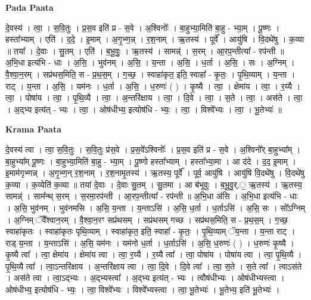 \documentclass[17pt]{extarticle}
\begin{document}
\textbf{Pada Paata} \newline

दे॒वस्य॑ । त्वा॒ । स॒वि॒तुः । प्र॒स॒व इति॑ प्र - स॒वे । अ॒श्विनोः᳚ । बा॒हुभ्या॒मिति॑ बा॒हु - भ्या॒म् । पू॒ष्णः । हस्ता᳚भ्याम् । एति॑ । द॒दे॒ । इ॒माम् । अ॒गृ॒भ्ण॒न्न् । र॒श॒नाम् । ऋ॒तस्य॑ । पूर्वे᳚ । आयु॑षि । वि॒दथे॑षु । क॒व्या ॥ तया᳚ । दे॒वाः । सु॒तम् । एति॑ । ब॒भू॒वुः॒ । ऋ॒तस्य॑ । सामन्न्॑ । स॒रम् । आ॒रप॒न्तीत्या᳚ - रप॑न्ती ॥ अ॒भि॒धा इत्य॑भि - धाः । अ॒सि॒ । भुव॑नम् । अ॒सि॒ । य॒न्ता । अ॒सि॒ । ध॒र्ता । अ॒सि॒ । सः । अ॒ग्निम् । वै॒श्वा॒न॒रम् । सप्र॑थस॒मिति॒ स - प्र॒थ॒स॒म् । ग॒च्छ॒ । स्वाहा॑कृत॒ इति॒ स्वाहा᳚ - कृ॒तः॒ । पृ॒थि॒व्याम् । य॒न्ता । राट् । य॒न्ता । अ॒सि॒ । यम॑नः । ध॒र्ता । अ॒सि॒ । ध॒रुणः॑ ( ) । कृ॒ष्यै । त्वा॒ । क्षेमा॑य । त्वा॒ । र॒य्यै । त्वा॒ । पोषा॑य । त्वा॒ । पृ॒थि॒व्यै । त्वा॒ । अ॒न्तरि॑क्षाय । त्वा॒ । दि॒वे । त्वा॒ । स॒ते । त्वा॒ । अस॑ते । त्वा॒ । अ॒द्भ्य इत्य॑त् - भ्यः । त्वा॒ । ओष॑धीभ्य॒ इत्योष॑धि - भ्यः॒ । त्वा॒ । विश्वे᳚भ्यः । त्वा॒ । भू॒तेभ्यः॑ ॥  \newline


\textbf{Krama Paata} \newline

दे॒वस्य॑ त्वा । त्वा॒ स॒वि॒तुः । स॒वि॒तुः प्र॑स॒वे । प्र॒स॒वे᳚ऽश्विनोः᳚ । प्र॒स॒व इति॑ प्र - स॒वे । अ॒श्विनो᳚र् बा॒हुभ्या᳚म् । बा॒हुभ्या᳚म् पू॒ष्णः । बा॒हुभ्या॒मिति॑ बा॒हु - भ्या॒म् । पू॒ष्णो हस्ता᳚भ्याम् । हस्ता᳚भ्या॒मा । आ द॑दे । द॒द॒ इ॒माम् । इ॒माम॑गृभ्णन्न् । अ॒गृ॒भ्ण॒न् र॒श॒नाम् । र॒श॒नामृ॒तस्य॑ । ऋ॒तस्य॒ पूर्वे᳚ । पूर्व॒ आयु॑षि । आयु॑षि वि॒दथे॑षु । वि॒दथे॑षु क॒व्या । क॒व्येति॑ क॒व्या ॥ तया॑ दे॒वाः । दे॒वाः सु॒तम् । सु॒तमा । आ ब॑भूवुः । ब॒भू॒वु॒र्.॒ ऋ॒तस्य॑ । ऋ॒तस्य॒ सामन्न्॑ । साम᳚न्थ् स॒रम् । स॒रमा॒रप॑न्ती । आ॒रप॒न्तीत्या᳚ - रप॑न्ती ॥ अ॒भि॒धा अ॑सि । अ॒भि॒धा इत्य॑भि - धाः । अ॒सि॒ भुव॑नम् । भुव॑नमसि । अ॒सि॒ य॒न्ता । य॒न्ताऽसि॑ । अ॒सि॒ ध॒र्ता । ध॒र्ताऽसि॑ । अ॒सि॒ सः । सो᳚ऽग्निम् । अ॒ग्निम् ॅवै᳚श्वान॒रम् । वै॒श्वा॒न॒रꣳ सप्र॑थसम् । सप्र॑थसम् गच्छ । सप्र॑थस॒मिति॒ स - प्र॒थ॒स॒म् । ग॒च्छ॒ स्वाहा॑कृतः । स्वाहा॑कृतः पृथि॒व्याम् । स्वाहा॑कृत॒ इति॒ स्वाहा᳚ - कृ॒तः॒ । पृ॒थि॒व्याम् ॅय॒न्ता । य॒न्ता राट् । राड्‍ य॒न्ता । य॒न्ताऽसि॑ । अ॒सि॒ यम॑नः । यम॑नो ध॒र्ता । ध॒र्ताऽसि॑ । अ॒सि॒ ध॒रुणः॑ ( ) । ध॒रुणः॑ कृ॒ष्यै । कृ॒ष्यै त्वा᳚ । त्वा॒ क्षेमा॑य । क्षेमा॑य त्वा । त्वा॒ र॒य्यै । र॒य्यै त्वा᳚ । त्वा॒ पोषा॑य । पोषा॑य त्वा । त्वा॒ पृ॒थि॒व्यै । पृ॒थि॒व्यै त्वा᳚ । त्वा॒ऽन्तरि॑क्षाय । अ॒न्तरि॑क्षाय त्वा । त्वा॒ दि॒वे । दि॒वे त्वा᳚ । त्वा॒ स॒ते । स॒ते त्वा᳚ । त्वाऽस॑ते । अस॑ते त्वा । त्वा॒ऽद्भ्यः । अ॒द्भ्यस्त्वा᳚ । अ॒द्भ्य इत्य॑त् - भ्यः । त्वौष॑धीभ्यः । ओष॑धीभ्यस्त्वा । ओष॑धीभ्य॒ इत्योष॑धि - भ्यः॒ । त्वा॒ विश्वे᳚भ्यः । विश्वे᳚भ्यस्त्वा । त्वा॒ भू॒तेभ्यः॑ । भू॒तेभ्य॒ इति॑ भू॒तेभ्यः॑ । \newline
\end{document}
